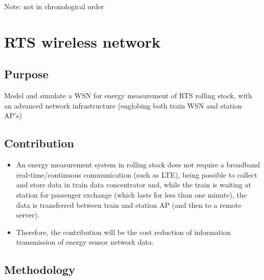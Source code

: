 
Note: not in chronological order

\section{RTS wireless network}


\subsection{Purpose}
Model and simulate a WSN for energy measurement of RTS rolling stock, with an advanced network infrastructure (englobing both train WSN and station AP’s)

\subsection{Contribution}

\begin{itemize}
	\setlength\itemsep{1em}
	\item An energy measurement system in rolling stock does not require a broadband real-time/continuous communication (such as LTE), being possible to collect and store data in train data concentrator and, while the train is waiting at station for passenger exchange (which lasts for less than one minute), the data is transferred between train and station AP (and then to a remote server).
	
	\item Therefore, the contribution will be the cost reduction of information transmission of energy sensor network data.
\end{itemize}

\subsection{Methodology}


